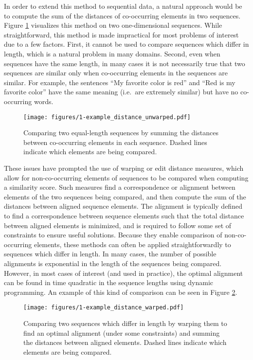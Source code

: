 In order to extend this method to sequential data, a natural approach would be to compute the sum of the distances of co-occurring elements in two sequences.
Figure \ref{fig:example_distance_unwarped} visualizes this method on two one-dimensional sequences.
While straightforward, this method is made impractical for most problems of interest due to a few factors.
First, it cannot be used to compare sequences which differ in length, which is a natural problem in many domains.
Second, even when sequences have the same length, in many cases it is not necessarily true that two sequences are similar only when co-occurring elements in the sequences are similar.
For example, the sentences ``My favorite color is red'' and ``Red is my favorite color'' have the same meaning (i.e.\ are extremely similar) but have no co-occurring words.

\begin{figure}
  \texttt{[image: figures/1-example\_distance\_unwarped.pdf]}
  \caption[Comparing two sequences without warping]{Comparing two equal-length sequences by summing the distances between co-occurring elements in each sequence.  Dashed lines indicate which elements are being compared.}
  \label{fig:example_distance_unwarped}
\end{figure}

These issues have prompted the use of warping or edit distance measures, which allow for non-co-occurring elements of sequences to be compared when computing a similarity score.
Such measures find a correspondence or alignment between elements of the two sequences being compared, and then compute the sum of the distances between aligned sequence elements.
The alignment is typically defined to find a correspondence between sequence elements such that the total distance between aligned elements is minimized, and is required to follow some set of constraints to ensure useful solutions.
Because they enable comparison of non-co-occurring elements, these methods can often be applied straightforwardly to sequences which differ in length.
In many cases, the number of possible alignments is exponential in the length of the sequences being compared.
However, in most cases of interest (and used in practice), the optimal alignment can be found in time quadratic in the sequence lengths using dynamic programming.
An example of this kind of comparison can be seen in Figure \ref{fig:example_distance_warped}.

\begin{figure}
  \texttt{[image: figures/1-example\_distance\_warped.pdf]}
  \caption[Comparing sequences under a warping measure]{Comparing two sequences which differ in length by warping them to find an optimal alignment (under some constraints) and summing the distances between aligned elements.  Dashed lines indicate which elements are being compared.}
  \label{fig:example_distance_warped}
\end{figure}

